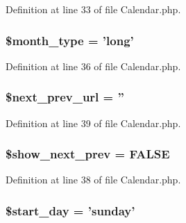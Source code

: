 Definition at line 33 of file Calendar.\-php.

\hypertarget{class_c_i___calendar_ab40961ce0a0e4a7ee10ad389c9566b28}{
\subsubsection[{\$month\-\_\-type}]{\setlength{\rightskip}{0pt plus 5cm}\$month\-\_\-type = 'long'}}\label{class_c_i___calendar_ab40961ce0a0e4a7ee10ad389c9566b28}


Definition at line 36 of file Calendar.\-php.

\hypertarget{class_c_i___calendar_a3ed0df912e3e67eb17d432c1f54ae2de}{
\subsubsection[{\$next\-\_\-prev\-\_\-url}]{\setlength{\rightskip}{0pt plus 5cm}\$next\-\_\-prev\-\_\-url = ''}}\label{class_c_i___calendar_a3ed0df912e3e67eb17d432c1f54ae2de}


Definition at line 39 of file Calendar.\-php.

\hypertarget{class_c_i___calendar_aeade2ffe515604c0dffb78d32ca846ae}{
\subsubsection[{\$show\-\_\-next\-\_\-prev}]{\setlength{\rightskip}{0pt plus 5cm}\$show\-\_\-next\-\_\-prev = F\-A\-L\-S\-E}}\label{class_c_i___calendar_aeade2ffe515604c0dffb78d32ca846ae}


Definition at line 38 of file Calendar.\-php.

\hypertarget{class_c_i___calendar_ac4e461505bb7cd9a2fdb2bf47560a389}{
\subsubsection[{\$start\-\_\-day}]{\setlength{\rightskip}{0pt plus 5cm}\$start\-\_\-day = 'sunday'}}\label{class_c_i___calendar_ac4e461505bb7cd9a2fdb2bf47560a389}


